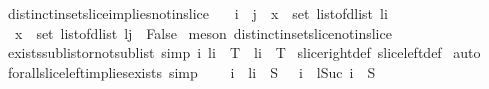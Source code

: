 \begin{isabellebody}
\ distinct{\isacharunderscore}in{\isacharunderscore}set{\isacharunderscore}slice{}{\isacharunderscore}implies{\isacharunderscore}not{\isacharunderscore}in{\isacharunderscore}slice{}{\isacharcolon}\ \isanewline
\ \ {\isachardoublequoteopen}i\ {\isasymle}\ j\ {\isasymLongrightarrow}\ x\ {\isasymin}\ set\ {\isacharparenleft}list{\isacharunderscore}of{\isacharunderscore}dlist\ {\isacharparenleft}l{\isasymdagger}{\isachardot}{\isachardot}i{\isacharparenright}{\isacharparenright}\ {\isasymLongrightarrow}\ \isanewline
\ \ x\ {\isasymin}\ set\ {\isacharparenleft}list{\isacharunderscore}of{\isacharunderscore}dlist\ {\isacharparenleft}l{\isasymdagger}j{\isachardot}{\isachardot}{\isacharparenright}{\isacharparenright}\ {\isasymLongrightarrow}\ False{\isachardoublequoteclose}\isanewline
%
\isadelimproof
%
\endisadelimproof
%
\isatagproof
{}\isamarkupfalse%
\ {\isacharparenleft}meson\ distinct{\isacharunderscore}in{\isacharunderscore}set{\isacharunderscore}slice{}{\isacharunderscore}not{\isacharunderscore}in{\isacharunderscore}slice{}{\isacharparenright}%
\endisatagproof
{\isafoldproof}%
%
\isadelimproof
\isanewline
%
\endisadelimproof
\isanewline
{}\isamarkupfalse%
\ exists{\isacharunderscore}sublist{\isacharunderscore}or{\isacharunderscore}not{\isacharunderscore}sublist\ {\isacharbrackleft}simp{\isacharbrackright}{\isacharcolon}\ {\isachardoublequoteopen}{\isasymexists}i{\isachardot}\ l{\isasymdagger}{\isachardot}{\isachardot}i\ {\isasymin}\ T\ {\isasymor}\ l{\isasymdagger}i{\isachardot}{\isachardot}\ {\isasymnotin}\ T{\isachardoublequoteclose}\isanewline
%
\isadelimproof
%
\endisadelimproof
%
\isatagproof
{}\isamarkupfalse%
\ slice{\isacharunderscore}right{\isacharunderscore}def\ slice{\isacharunderscore}left{\isacharunderscore}def\isanewline
{}\isamarkupfalse%
\ auto%
\endisatagproof
{\isafoldproof}%
%
\isadelimproof
\isanewline
%
\endisadelimproof
\isanewline
{}\isamarkupfalse%
\ forall{\isacharunderscore}slice{\isacharunderscore}left{\isacharunderscore}implies{\isacharunderscore}exists\ {\isacharbrackleft}simp{\isacharbrackright}{\isacharcolon}\ \isanewline
\ \ {\isachardoublequoteopen}{\isasymforall}\ i\ {\isachardot}\ l{\isasymdagger}i{\isachardot}{\isachardot}\ {\isasymin}\ S\ {\isasymLongrightarrow}\ {\isasymexists}\ i\ {\isachardot}\ l{\isasymdagger}{\isacharparenleft}Suc\ i{\isacharparenright}{\isachardot}{\isachardot}\ {\isasymin}\ S{\isachardoublequoteclose}\isanewline
%
\isadelimproof
%
\endisadelimproof
%
\isatagproof
{}\isamarkupfalse%

\end{isabellebody}
